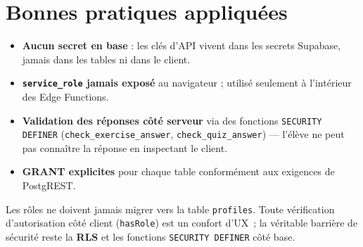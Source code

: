 \section{Bonnes pratiques appliquées}
\begin{itemize}
  \item \textbf{Aucun secret en base} : les clés d'API vivent dans les secrets
        Supabase, jamais dans les tables ni dans le client.
  \item \textbf{\texttt{service\_role} jamais exposé} au navigateur ; utilisé
        seulement à l'intérieur des Edge Functions.
  \item \textbf{Validation des réponses côté serveur} via des fonctions
        \texttt{SECURITY DEFINER} (\texttt{check\_exercise\_answer},
        \texttt{check\_quiz\_answer}) --- l'élève ne peut pas connaître la réponse
        en inspectant le client.
  \item \textbf{GRANT explicites} pour chaque table conformément aux exigences de
        PostgREST.
\end{itemize}

\begin{infobox}
Les rôles ne doivent jamais migrer vers la table \texttt{profiles}. Toute
vérification d'autorisation côté client (\texttt{hasRole}) est un confort d'UX~;
la véritable barrière de sécurité reste la \textbf{RLS} et les fonctions
\texttt{SECURITY DEFINER} côté base.
\end{infobox}
